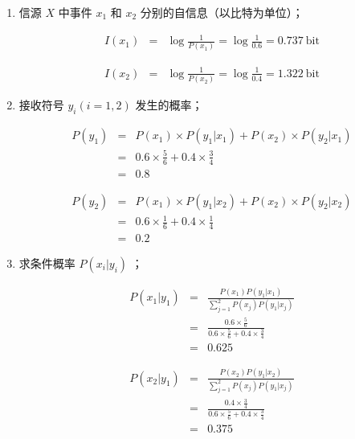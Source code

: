 \documentclass[onecolumn,oneside]{BUPTHomework}
\begin{document}
  \begin{solution}
  {
    \begin{enumerate}
      \item 信源 $X$ 中事件 $x_1$ 和 $x_2$ 分别的自信息（以比特为单位）；
      
      \begin{eqnarray} 
        I(x_1) &=& \log \frac{1}{P(x_1)} = \log \frac{1}{0.6} = 0.737\ \mbox{bit} \nonumber
      \end{eqnarray}
      
      \begin{eqnarray} 
        I(x_2) &=& \log \frac{1}{P(x_2)} = \log \frac{1}{0.4} = 1.322\ \mbox{bit} \nonumber
      \end{eqnarray}

      \item 接收符号 $y_i(i=1,2)$ 发生的概率；
      
      \begin{eqnarray} 
        P(y_1) &=& P(x_1) \times P(y_1 \vert x_1) + P(x_2) \times P(y_2 \vert x_1) \nonumber \\
        &=& 0.6 \times \frac{5}{6} + 0.4 \times \frac{3}{4} \nonumber \\
        &=& 0.8 \nonumber
      \end{eqnarray}

      \begin{eqnarray} 
        P(y_2) &=& P(x_1) \times P(y_1 \vert x_2) + P(x_2) \times P(y_2 \vert x_2) \nonumber \\
        &=& 0.6 \times \frac{1}{6} + 0.4 \times \frac{1}{4} \nonumber \\
        &=& 0.2 \nonumber 
      \end{eqnarray}

      \item 求条件概率 $P(x_i \vert y_i)$ ；
      
      \begin{eqnarray} 
        P(x_1 \vert y_1) &=& \frac{P(x_1)P(y_1 \vert x_1)}{\sum_{j=1}^2P(x_j)P(y_1 \vert x_j)} \nonumber \\
        &=& \frac{0.6 \times \frac{5}{6}}{0.6 \times \frac{5}{6} + 0.4 \times \frac{3}{4}} \nonumber \\
        &=& 0.625 \nonumber
      \end{eqnarray}

      \begin{eqnarray} 
        P(x_2 \vert y_1) &=& \frac{P(x_2)P(y_1 \vert x_2)}{\sum_{j=1}^2P(x_j)P(y_1 \vert x_j)} \nonumber \\
        &=& \frac{0.4 \times \frac{3}{4}}{0.6 \times \frac{5}{6} + 0.4 \times \frac{3}{4}} \nonumber \\
        &=& 0.375 \nonumber
      \end{eqnarray}


\end{enumerate}}
\end{solution}
\end{document}
